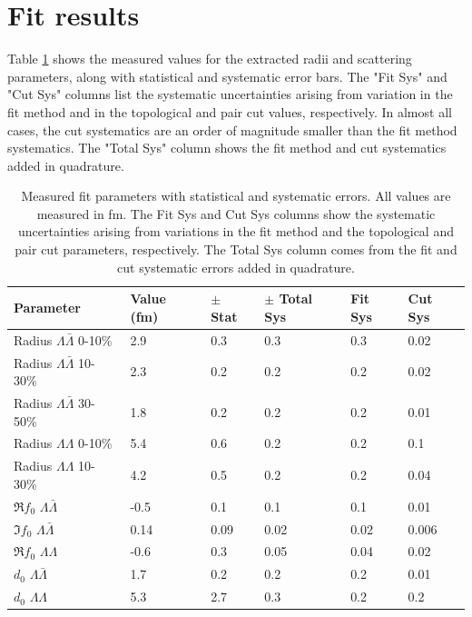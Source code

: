 \section{Fit results}
\label{sec:FitResults}

Table \ref{tab:FitParams} shows the measured values for the extracted radii and scattering parameters, along with statistical and systematic error bars.
The "Fit Sys" and "Cut Sys" columns list the systematic uncertainties arising from variation in the fit method and in the topological and pair cut values, respectively.
In almost all cases, the cut systematics are an order of magnitude smaller than the fit method systematics.
The "Total Sys" column shows the fit method and cut systematics added in quadrature.

\begin{table}
\label{FitResultsTable}
\begin{center}
\begin{tabular}{|l|l|l|l|l|l|}
\hline 
Parameter & Value (fm) & $\pm$ Stat & $\pm$ Total Sys & Fit Sys & Cut Sys \\ 
\hline 
Radius $\Lambda\bar{\Lambda}$ 0-10\% & 2.9 & 0.3 & 0.3 & 0.3 & 0.02 \\ 
\hline 
Radius $\Lambda\bar{\Lambda}$ 10-30\%  & 2.3 & 0.2 & 0.2 & 0.2 & 0.02 \\ 
\hline 
Radius $\Lambda\bar{\Lambda}$ 30-50\%  & 1.8 & 0.2 & 0.2 & 0.2 & 0.01 \\ 
\hline 
Radius $\Lambda\Lambda$ 0-10\% & 5.4 & 0.6 & 0.2 & 0.2 & 0.1 \\ 
\hline 
Radius $\Lambda\Lambda$ 10-30\% & 4.2 & 0.5 & 0.2 & 0.2 & 0.04 \\ 
\hline 
$\Re f_0$ $\Lambda\bar{\Lambda}$ & -0.5 & 0.1 & 0.1 & 0.1 & 0.01 \\ 
\hline 
$\Im f_0$ $\Lambda\bar{\Lambda}$ & 0.14 & 0.09 & 0.02 & 0.02 & 0.006 \\ 
\hline 
$\Re f_0$ $\Lambda\Lambda$ & -0.6 & 0.3 & 0.05 & 0.04 & 0.02 \\ 
\hline 
$d_0$ $\Lambda\bar{\Lambda}$ & 1.7 & 0.2 & 0.2 & 0.2 & 0.01 \\ 
\hline 
$d_0$ $\Lambda\Lambda$ & 5.3 & 2.7 & 0.3 & 0.2 & 0.2 \\ 
\hline 
\end{tabular} 
\end{center}
\caption[Fit results]{Measured fit parameters with statistical and systematic errors.
All values are measured in fm.
The Fit Sys and Cut Sys columns show the systematic uncertainties arising from variations in the fit method and the topological and pair cut parameters, respectively.
The Total Sys column comes from the fit and cut systematic errors added in quadrature. }
\label{tab:FitParams}
\end{table}






